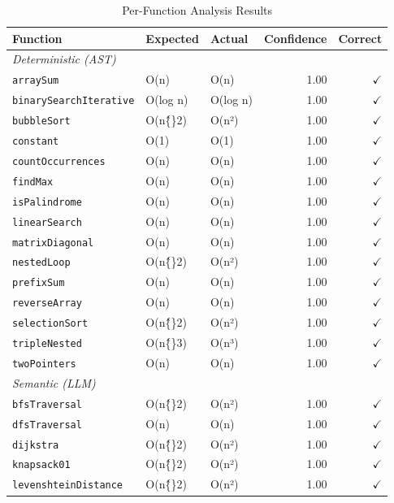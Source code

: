 \begin{table}[h]
  \centering
  \caption{Per-Function Analysis Results}
  \label{tab:per-function}
  \begin{tabular}{lllrr}
    \toprule
    Function & Expected & Actual & Confidence & Correct \\
    \midrule
    \multicolumn{5}{l}{\textit{Deterministic (AST)}} \\
    \texttt{arraySum} & O(n) & O(n) & 1.00 & $\checkmark$ \\
    \texttt{binarySearchIterative} & O(log n) & O(log n) & 1.00 & $\checkmark$ \\
    \texttt{bubbleSort} & O(n\^\{\}2) & O(n²) & 1.00 & $\checkmark$ \\
    \texttt{constant} & O(1) & O(1) & 1.00 & $\checkmark$ \\
    \texttt{countOccurrences} & O(n) & O(n) & 1.00 & $\checkmark$ \\
    \texttt{findMax} & O(n) & O(n) & 1.00 & $\checkmark$ \\
    \texttt{isPalindrome} & O(n) & O(n) & 1.00 & $\checkmark$ \\
    \texttt{linearSearch} & O(n) & O(n) & 1.00 & $\checkmark$ \\
    \texttt{matrixDiagonal} & O(n) & O(n) & 1.00 & $\checkmark$ \\
    \texttt{nestedLoop} & O(n\^\{\}2) & O(n²) & 1.00 & $\checkmark$ \\
    \texttt{prefixSum} & O(n) & O(n) & 1.00 & $\checkmark$ \\
    \texttt{reverseArray} & O(n) & O(n) & 1.00 & $\checkmark$ \\
    \texttt{selectionSort} & O(n\^\{\}2) & O(n²) & 1.00 & $\checkmark$ \\
    \texttt{tripleNested} & O(n\^\{\}3) & O(n³) & 1.00 & $\checkmark$ \\
    \texttt{twoPointers} & O(n) & O(n) & 1.00 & $\checkmark$ \\
    \multicolumn{5}{l}{\textit{Semantic (LLM)}} \\
    \texttt{bfsTraversal} & O(n\^\{\}2) & O(n²) & 1.00 & $\checkmark$ \\
    \texttt{dfsTraversal} & O(n) & O(n) & 1.00 & $\checkmark$ \\
    \texttt{dijkstra} & O(n\^\{\}2) & O(n²) & 1.00 & $\checkmark$ \\
    \texttt{knapsack01} & O(n\^\{\}2) & O(n²) & 1.00 & $\checkmark$ \\
    \texttt{levenshteinDistance} & O(n\^\{\}2) & O(n²) & 1.00 & $\checkmark$ \\

\end{tabular}
\end{table}
